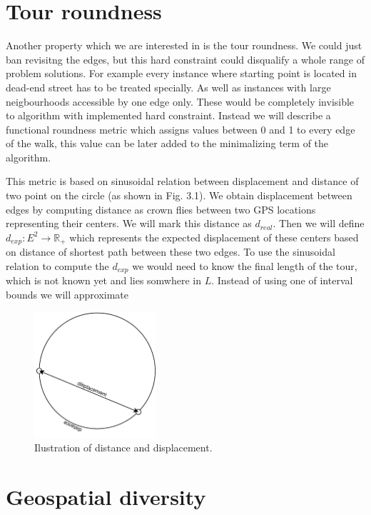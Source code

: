 \documentclass{ctuthesis}
\begin{document}
\section{Tour roundness}
Another property which we are interested in is the tour roundness. We could just ban revisitng the edges, but this hard constraint could disqualify a whole range of problem solutions. For example every instance where starting point is located in dead-end street has to be treated specially. As well as instances with large neigbourhoods accessible by one edge only. These would be completely invisible to algorithm with implemented hard constraint. Instead we will describe a functional roundness metric which assigns values between 0 and 1 to every edge of the walk, this value can be later added to the minimalizing term of the algorithm.\par
This metric is based on sinusoidal relation between displacement and distance of two point on the circle (as shown in Fig. 3.1). We obtain displacement between edges by computing distance as crown flies between two GPS locations representing their centers. We will mark this distance as \(d_{real}\). Then we will define \(d_{exp}: E^2 \rightarrow \mathbb{R_+}\) which represents the expected displacement of these centers based on distance of shortest path between these two edges. To use the sinusoidal relation to compute the \(d_{exp}\) we would need to know the final length of the tour, which is not known yet and lies somwhere in \(L\). Instead of using one of interval bounds we will approximate 

\begin{figure}
\includegraphics[width=0.4\textwidth]{displacement}
\caption{Ilustration of distance and displacement.}
\end{figure}

\section{Geospatial diversity}
\end{document}
